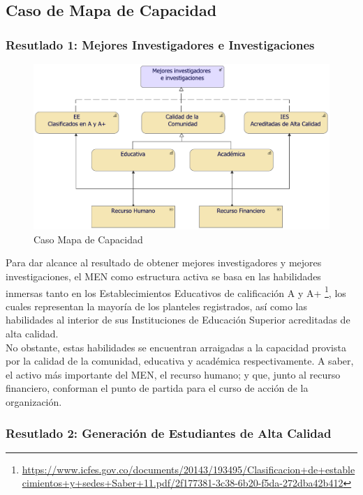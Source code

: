 \newpage

\subsection{Caso de Mapa de Capacidad}

\subsubsection{Resutlado 1: Mejores Investigadores e Investigaciones}

\begin{figure}[h!]
	\centering
	\includegraphics[width=1\linewidth]{imgs/modelo/estrategia/capacidad/1.pdf}
	\caption{Caso Mapa de Capacidad}
\end{figure}

Para dar alcance al resultado de obtener mejores investigadores y mejores investigaciones, el MEN como estructura activa se basa en las habilidades inmersas tanto en los Establecimientos Educativos de calificación A y A+ \footnote{\url{https://www.icfes.gov.co/documents/20143/193495/Clasificacion+de+establecimientos+y+sedes+Saber+11.pdf/2f177381-3c38-6b20-f5da-272dba42b412}}, los cuales representan la mayoría de los planteles registrados, así como las habilidades al interior de sus Instituciones de Educación Superior acreditadas de alta calidad. \\

No obstante, estas habilidades se encuentran arraigadas a la capacidad provista por la calidad de la comunidad, educativa y académica respectivamente. A saber, el activo más importante del MEN, el recurso humano; y que, junto al recurso financiero, conforman el punto de partida para el curso de acción de la organización.

\clearpage
\subsubsection{Resutlado 2: Generación de Estudiantes de Alta Calidad}


